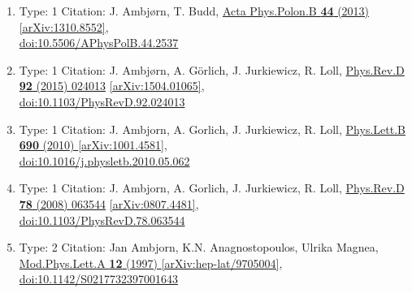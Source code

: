 \documentclass[a4paper,10pt]{article}
\begin{document}
\begin{enumerate}
\begin{enumerate}
  \item Type: 1 Citation: J. Ambjørn, T. Budd, \href{https://www.doi.org/10.5506/APhysPolB.44.2537}{Acta Phys.Polon.B {\bf 44} (2013) }  \href{https://arxiv.org/abs/1310.8552}{[arXiv:1310.8552]},\\\href{https://www.doi.org/10.5506/APhysPolB.44.2537}{doi:10.5506/APhysPolB.44.2537}
  \item Type: 1 Citation: J. Ambjørn, A. Görlich, J. Jurkiewicz, R. Loll, \href{https://www.doi.org/10.1103/PhysRevD.92.024013}{Phys.Rev.D {\bf 92} (2015) 024013}  \href{https://arxiv.org/abs/1504.01065}{[arXiv:1504.01065]},\\\href{https://www.doi.org/10.1103/PhysRevD.92.024013}{doi:10.1103/PhysRevD.92.024013}
  \item Type: 1 Citation: J. Ambjorn, A. Gorlich, J. Jurkiewicz, R. Loll, \href{https://www.doi.org/10.1016/j.physletb.2010.05.062}{Phys.Lett.B {\bf 690} (2010) }  \href{https://arxiv.org/abs/1001.4581}{[arXiv:1001.4581]},\\\href{https://www.doi.org/10.1016/j.physletb.2010.05.062}{doi:10.1016/j.physletb.2010.05.062}
  \item Type: 1 Citation: J. Ambjorn, A. Gorlich, J. Jurkiewicz, R. Loll, \href{https://www.doi.org/10.1103/PhysRevD.78.063544}{Phys.Rev.D {\bf 78} (2008) 063544}  \href{https://arxiv.org/abs/0807.4481}{[arXiv:0807.4481]},\\\href{https://www.doi.org/10.1103/PhysRevD.78.063544}{doi:10.1103/PhysRevD.78.063544}
  \item Type: 2 Citation: Jan Ambjorn, K.N. Anagnostopoulos, Ulrika Magnea, \href{https://www.doi.org/10.1142/S0217732397001643}{Mod.Phys.Lett.A {\bf 12} (1997) }  \href{https://arxiv.org/abs/hep-lat/9705004}{[arXiv:hep-lat/9705004]},\\\href{https://www.doi.org/10.1142/S0217732397001643}{doi:10.1142/S0217732397001643}

\end{enumerate}
\end{enumerate}
\end{document}
